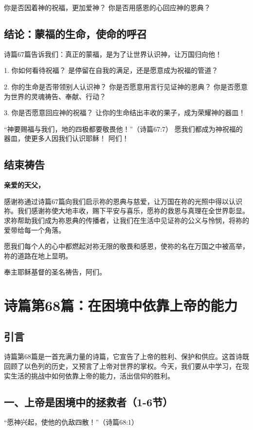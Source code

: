 \documentclass[a4paper, 12pt]{article}
\begin{document}
你是否因着神的祝福，更加爱神？
你是否用感恩的心回应神的恩典？

\subsection*{结论：蒙福的生命，使命的呼召}
诗篇67篇告诉我们：真正的蒙福，是为了让世界认识神，让万国归向他！

1. 你如何看待祝福？
是停留在自我的满足，还是愿意成为祝福的管道？

2. 你的生命是否带领别人认识神？
你是否愿意用言行见证神的恩典？
你是否愿意为世界的灵魂祷告、奉献、行动？

3. 你是否愿意回应神的祝福？
让你的生命结出丰收的果子，成为荣耀神的器皿！

“神要赐福与我们，地的四极都要敬畏他！”（诗篇67:7）
愿我们都成为神祝福的器皿，使更多人因我们认识耶稣！
阿们！
\subsection*{结束祷告}
\textbf{亲爱的天父，}

感谢祢通过诗篇67篇向我们启示祢的恩典与慈爱，让万国在祢的光照中得以认识祢。我们感谢祢使大地丰收，赐下平安与喜乐，愿祢的救恩与真理在全世界彰显。求祢帮助我们成为祢恩典的传播者，让我们在生活中见证祢的公义与怜悯，将祢的爱带给每一个角落。

愿我们每个人的心中都燃起对祢无限的敬畏和感恩，使祢的名在万国之中被高举，祢的道路在地上显明。

奉主耶稣基督的圣名祷告，阿们。
\newpage
\section{诗篇第68篇：在困境中依靠上帝的能力}
\subsection*{引言}
诗篇第68篇是一首充满力量的诗篇，它宣告了上帝的胜利、保护和供应。这首诗既回顾了以色列的历史，又预言了上帝对世界的掌权。今天，我们要从中学习，在现实生活的挑战中如何依靠上帝的能力，活出信仰的胜利。

\subsection*{一、上帝是困境中的拯救者（1-6节）}
“愿神兴起，使他的仇敌四散！”（诗篇68:1）
\end{document}
